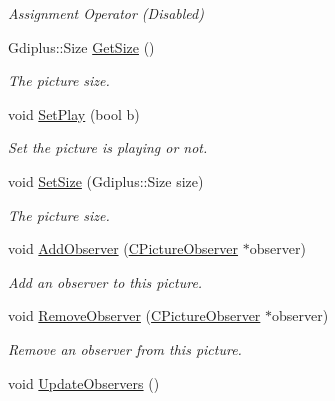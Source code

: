 \begin{DoxyCompactItemize}
\begin{DoxyCompactList}\small\item\em Assignment Operator (Disabled) \end{DoxyCompactList}\item 
Gdiplus\+::\+Size \hyperlink{class_c_picture_af2677c395a3cb8d6e7d0860839801e5b}{Get\+Size} ()
\begin{DoxyCompactList}\small\item\em The picture size. \end{DoxyCompactList}\item 
void \hyperlink{class_c_picture_a070bb83f16f8e20bedc06ca36b445e0f}{Set\+Play} (bool b)
\begin{DoxyCompactList}\small\item\em Set the picture is playing or not. \end{DoxyCompactList}\item 
void \hyperlink{class_c_picture_a66b8de27d3435e19024307254e918e3a}{Set\+Size} (Gdiplus\+::\+Size size)
\begin{DoxyCompactList}\small\item\em The picture size. \end{DoxyCompactList}\item 
void \hyperlink{class_c_picture_a6be8632e9b1c468dcf27e8452baf5605}{Add\+Observer} (\hyperlink{class_c_picture_observer}{C\+Picture\+Observer} $\ast$observer)
\begin{DoxyCompactList}\small\item\em Add an observer to this picture. \end{DoxyCompactList}\item 
void \hyperlink{class_c_picture_a548ad72979b2a11c2669d9896f32bf92}{Remove\+Observer} (\hyperlink{class_c_picture_observer}{C\+Picture\+Observer} $\ast$observer)
\begin{DoxyCompactList}\small\item\em Remove an observer from this picture. \end{DoxyCompactList}\item 
\hypertarget{class_c_picture_a971ca9c9100725b7d1a900adcfe889d6}{void \hyperlink{class_c_picture_a971ca9c9100725b7d1a900adcfe889d6}{Update\+Observers} ()}\label{class_c_picture_a971ca9c9100725b7d1a900adcfe889d6}


\end{DoxyCompactItemize}

